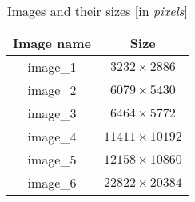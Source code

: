\begin{table}[h]
\caption{Images and their sizes [in {\em pixels}]}
\centering
\begin{tabular}{c c} 
\hline\hline
Image name & Size\\ [0.5ex] 
\hline 
image\_1 & $3232 \times 2886 $\\
image\_2 & $6079 \times 5430$ \\
image\_3 & $6464 \times 5772$ \\
image\_4 & $11411 \times 10192$ \\
image\_5 & $12158 \times 10860 $\\ 
image\_6 & $22822 \times 20384 $\\
[1ex]
\hline
\end{tabular}
\label{table:sequ} 
\end{table}
